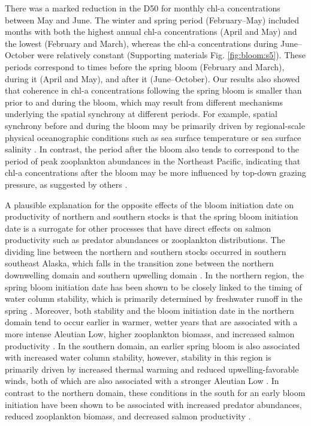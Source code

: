 There was a marked reduction in the D50 for monthly chl-a concentrations between
May and June. The winter and spring period (February--May) included months with
both the highest annual chl-a concentrations (April and May) and the lowest
(February and March), whereas the chl-a concentrations during June--October were
relatively constant (Supporting materials Fig. \ref{fig:bloom:s5}). These
periods correspond to times before the spring bloom (February and March), during
it (April and May), and after it (June--October). Our results also showed that
coherence in chl-a concentrations following the spring bloom is smaller than
prior to and during the bloom, which may result from different mechanisms
underlying the spatial synchrony at different periods. For example, spatial
synchrony before and during the bloom may be primarily driven by regional-scale
physical oceanographic conditions such as sea surface temperature or sea surface
salinity \citep{Henson2007a}. In contrast, the period after the bloom also tends
to correspond to the period of peak zooplankton abundances in the Northeast
Pacific, indicating that chl-a concentrations after the bloom may be more
influenced by top-down grazing pressure, as suggested by others
\citep{Chittenden2010a, Bornhold2000, Mackas2012}.

A plausible explanation for the opposite effects of the bloom initiation date on
productivity of northern and southern stocks is that the spring bloom initiation
date is a surrogate for other processes that have direct effects on salmon
productivity such as predator abundances or zooplankton distributions. The
dividing line between the northern and southern stocks occurred in southern
southeast Alaska, which falls in the transition zone between the northern
downwelling domain and southern upwelling domain \citep{Ware1989a}. In the
northern region, the spring bloom initiation date has been shown to be closely
linked to the timing of water column stability, which is primarily determined by
freshwater runoff in the spring \citep{Weingartner2005a, Henson2007a}. Moreover,
both stability and the bloom initiation date in the northern domain tend to
occur earlier in warmer, wetter years that are associated with a more intense
Aleutian Low, higher zooplankton biomass, and increased salmon productivity
\citep{Brodeur1992a, Mueter2002a}. In the southern domain, an earlier spring
bloom is also associated with increased water column stability, however,
stability in this region is primarily driven by increased thermal warming and
reduced upwelling-favorable winds, both of which are also associated with a
stronger Aleutian Low \citep{Polovina1995a, Henson2007a}. In contrast to the
northern domain, these conditions in the south for an early bloom initiation
have been shown to be associated with increased predator abundances, reduced
zooplankton biomass, and decreased salmon productivity \citep{Ware1995a,
Mackas2001a, Mueter2002a}.

